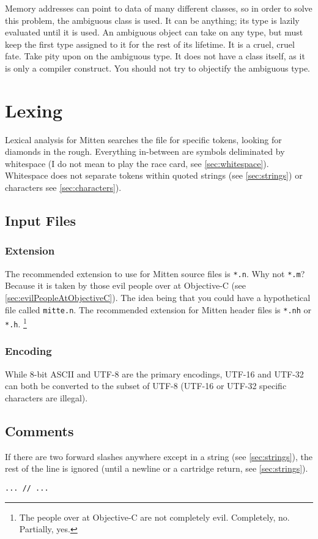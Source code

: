 \documentclass[10pt,a4paper]{article}
\begin{document}
Memory addresses can point to data of many different classes, so in order to solve this problem, the ambiguous class is used. It can be anything; its type is lazily evaluated until it is used. An ambiguous object can take on any type, but must keep the first type assigned to it for the rest of its lifetime. It is a cruel, cruel fate. Take pity upon on the ambiguous type. It does not have a class itself, as it is only a compiler construct. You should not try to objectify the ambiguous type.

\section{Lexing}
Lexical analysis for Mitten searches the file for specific tokens, looking for diamonds in the rough. Everything in-between are symbols deliminated by whitespace (I do not mean to play the race card, see \ref{sec:whitespace}). Whitespace does not separate tokens within quoted strings (see \ref{sec:strings}) or characters see \ref{sec:characters}).

\subsection{Input Files}
\subsubsection{Extension}
The recommended extension to use for Mitten source files is \verb|*.n|. Why not \verb|*.m|? Because it is taken by those evil people over at Objective-C (see \ref{sec:evilPeopleAtObjectiveC}). The idea being that you could have a hypothetical file called \verb|mitte.n|. The recommended extension for Mitten header files is \verb|*.nh| or \verb|*.h|. \footnote{The people over at Objective-C are not completely evil. Completely, no. Partially, yes.}

\subsubsection{Encoding}
While 8-bit ASCII and UTF-8 are the primary encodings, UTF-16 and UTF-32 can both be converted to the subset of UTF-8 (UTF-16 or UTF-32 specific characters are illegal).

\subsection{Comments}
\label{sec:comments}
If there are two forward slashes anywhere except in a string (see \ref{sec:strings}), the rest of the line is ignored (until a newline or a cartridge return, see \ref{sec:strings}).
\begin{verbatim}
... // ...
\end{verbatim}
\end{document}
